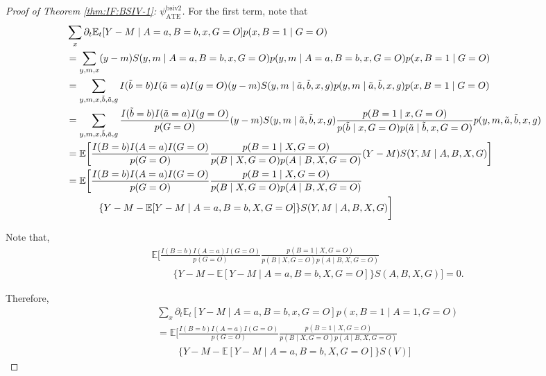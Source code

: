 \documentclass[10pt]{article}
\begin{document}
\begin{proof}[Proof of Theorem \ref{thm:IF:BSIV-1}: $\psi_{\text{ATE}}^{\text{bsiv2}}$]
For the first term, note that
{\footnotesize \begin{align*}
    &\sum_{x}\partial_t\mathbb{E}_t[Y-M\mid A=a,B=b,x,G=O]p(x,B=1\mid G=O)\\
    &=\sum_{y,m,x}(y-m)S(y,m\mid A=a,B=b,x,G=O)p(y,m\mid A=a,B=b,x,G=O)p(x,B=1\mid G=O)\\
    &=\sum_{y,m,x,\Tilde{b},\Tilde{a},g}I(\Tilde{b}=b)I(\Tilde{a}=a)I(g=O)(y-m)S(y,m\mid \Tilde{a},\Tilde{b},x,g)p(y,m\mid \Tilde{a},\Tilde{b},x,g)p(x,B=1\mid G=O)\\
    &=\sum_{y,m,x,\Tilde{b},\Tilde{a},g}\frac{I(\Tilde{b}=b)I(\Tilde{a}=a)I(g=O)}{p(G=O)}(y-m)S(y,m\mid \Tilde{a},\Tilde{b},x,g)\frac{p(B=1\mid x,G=O)}{p(\Tilde{b}\mid x,G=O)p(\Tilde{a}\mid\Tilde{b},x,G=O)}p(y,m, \Tilde{a},\Tilde{b},x,g)\\
    &=\mathbb{E}\bigg[\frac{I(B=b)I(A=a)I(G=O)}{p(G=O)}\frac{p(B=1\mid X,G=O)}{p(B\mid X,G=O)p(A\mid B, X,G=O)}(Y-M)S(Y,M\mid A,B,X,G)\bigg]\\
    &=\mathbb{E}\bigg[\frac{I(B=b)I(A=a)I(G=O)}{p(G=O)}\frac{p(B=1\mid X,G=O)}{p(B\mid X,G=O)p(A\mid B, X,G=O)}\\
    &\ \ \ \ \ \ \ \ \ \ \{Y-M-\mathbb{E}[Y-M\mid A=a,B=b,X,G=O]\}S(Y,M\mid A,B,X,G)\bigg]
\end{align*}}

Note that,
\begin{align*}
    &\mathbb{E}\bigg[\frac{I(B=b)I(A=a)I(G=O)}{p(G=O)}\frac{p(B=1\mid X,G=O)}{p(B\mid X,G=O)p(A\mid B, X,G=O)}\\
    &\ \ \ \ \ \ \ \ \ \ \{Y-M-\mathbb{E}[Y-M\mid A=a,B=b,X,G=O]\}S(A,B,X,G)\bigg]=0.
\end{align*}

Therefore,
\begin{align*}
    &\sum_{x}\partial_t\mathbb{E}_t[Y-M\mid A=a,B=b,x,G=O]p(x,B=1\mid A=1, G=O)\\
    &=\mathbb{E}\bigg[\frac{I(B=b)I(A=a)I(G=O)}{p(G=O)}\frac{p(B=1\mid X,G=O)}{p(B\mid X,G=O)p(A\mid B, X,G=O)}\\
    &\ \ \ \ \ \ \ \ \ \ \{Y-M-\mathbb{E}[Y-M\mid A=a,B=b,X,G=O]\}S(V)\bigg]
\end{align*}


\end{proof}
\end{document}
